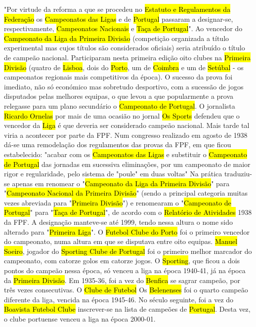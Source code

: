 \documentclass[a4paper,12pt]{article}
\begin{document}
"Por virtude da reforma a que se procedeu no \hl{Estatuto e Regulamentos da Federação} os \hl{Campeonatos das Ligas} e de \hl{Portugal} passaram a designar-se, respectivamente, \hl{Campeonatos Nacionais} e \hl{Taça de Portugal}".
Ao vencedor do \hl{Campeonato da Liga da Primeira Divisão} (competição organizada a título experimental mas cujos títulos são considerados oficiais) seria atribuído o título de campeão nacional.
Participaram nesta primeira edição oito clubes na \hl{Primeira Divisão} (quatro de \hl{Lisboa}, dois do \hl{Porto}, um de \hl{Coimbra} e um de \hl{Setúbal} - os campeonatos regionais mais competitivos da época).
O sucesso da prova foi imediato, não só económico mas sobretudo desportivo, com a sucessão de jogos disputados pelas melhores equipas, o que levou a que popularmente a prova relegasse para um plano secundário o \hl{Campeonato de Portugal}. O jornalista \hl{Ricardo Ornelas} por mais de uma ocasião no jornal \hl{Os Sports} defendeu que o vencedor da \hl{Liga} é que deveria ser considerado campeão nacional. Mais tarde tal viria a acontecer por parte da FPF.
Num congresso realizado em agosto de 1938 dá-se uma remodelação dos regulamentos das provas da FPF, em que ficou estabelecido:
"acabar com os \hl{Campeonatos das Ligas} e substituir o \hl{Campeonato de Portugal} das jornadas em sucessiva eliminações, por um campeonato de maior rigor e regularidade, pelo sistema de "poule" em duas voltas"
Na prática traduziu-se apenas em renomear o "\hl{Campeonato da Liga da Primeira Divisão}" para "\hl{Campeonato Nacional da Primeira Divisão}" (sendo a principal categoria muitas vezes abreviada para "\hl{Primeira Divisão}") e renomearam o "\hl{Campeonato de Portugal}" para "\hl{Taça de Portugal}", de acordo com o \hl{Relatório de Atividades} 1938 da FPF. A designação manteve-se até 1999, tendo nessa altura o nome sido alterado para "\hl{Primeira Liga}".
O \hl{Futebol Clube do Porto} foi o primeiro vencedor do campeonato, numa altura em que se disputava entre oito equipas. \hl{Manuel Soeiro}, jogador do \hl{Sporting Clube de Portugal} foi o primeiro melhor marcador do campeonato, com catorze golos em catorze jogos. O \hl{Sporting}, que ficou a dois pontos do campeão nessa época, só venceu a liga na época 1940-41, já na época da \hl{Primeira Divisão}.
Em 1935-36, foi a vez do \hl{Benfica} se sagrar campeão, por três vezes consecutivas. O \hl{Clube de Futebol} Os \hl{Belenenses} foi o quarto campeão diferente da liga, vencida na época 1945-46. No século seguinte, foi a vez do \hl{Boavista Futebol Clube} inscrever-se na lista de campeões de \hl{Portugal}. Desta vez, o clube portuense venceu a liga na época 2000-01.
\end{document}

